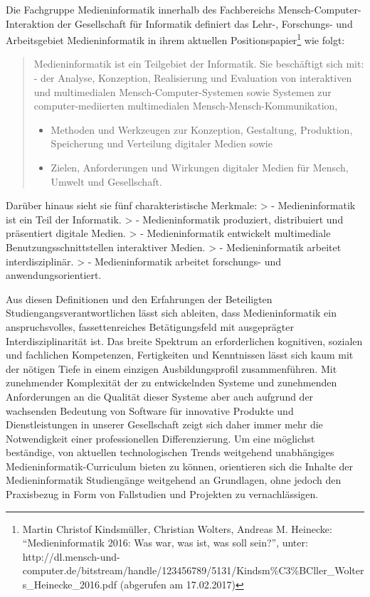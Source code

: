 Die Fachgruppe Medieninformatik innerhalb des Fachbereichs
Mensch-Computer-Interaktion der Gesellschaft für Informatik definiert
das Lehr-, Forschungs- und Arbeitsgebiet Medieninformatik in ihrem
aktuellen Positionspapier\footnote{Martin Christof Kindsmüller,
  Christian Wolters, Andreas M. Heinecke: ``Medieninformatik 2016: Was
  war, was ist, was soll sein?'', unter:
  http://dl.mensch-und-computer.de/bitstream/handle/123456789/5131/Kindsm\%C3\%BCller\_Wolters\_Heinecke\_2016.pdf
  (abgerufen am 17.02.2017)} wie folgt:

\begin{quote}
Medieninformatik ist ein Teilgebiet der Informatik. Sie beschäftigt sich
mit: - der Analyse, Konzeption, Realisierung und Evaluation von
interaktiven und multimedialen Mensch-Computer-Systemen sowie Systemen
zur computer-mediierten multimedialen Mensch-Mensch-Kommunikation,

\begin{itemize}
\tightlist
\item
  Methoden und Werkzeugen zur Konzeption, Gestaltung, Produktion,
  Speicherung und Verteilung digitaler Medien sowie
\item
  Zielen, Anforderungen und Wirkungen digitaler Medien für Mensch,
  Umwelt und Gesellschaft.
\end{itemize}
\end{quote}

Darüber hinaus sieht sie fünf charakteristische Merkmale: \textgreater{}
- Medieninformatik ist ein Teil der Informatik. \textgreater{} -
Medieninformatik produziert, distribuiert und präsentiert digitale
Medien. \textgreater{} - Medieninformatik entwickelt multimediale
Benutzungsschnittstellen interaktiver Medien. \textgreater{} -
Medieninformatik arbeitet interdisziplinär. \textgreater{} -
Medieninformatik arbeitet forschungs- und anwendungsorientiert.

Aus diesen Definitionen und den Erfahrungen der Beteiligten
Studiengangsverantwortlichen lässt sich ableiten, dass Medieninformatik
ein anspruchsvolles, fassettenreiches Betätigungsfeld mit ausgeprägter
Interdisziplinarität ist. Das breite Spektrum an erforderlichen
kognitiven, sozialen und fachlichen Kompetenzen, Fertigkeiten und
Kenntnissen lässt sich kaum mit der nötigen Tiefe in einem einzigen
Ausbildungsprofil zusammenführen. Mit zunehmender Komplexität der zu
entwickelnden Systeme und zunehmenden Anforderungen an die Qualität
dieser Systeme aber auch aufgrund der wachsenden Bedeutung von Software
für innovative Produkte und Dienstleistungen in unserer Gesellschaft
zeigt sich daher immer mehr die Notwendigkeit einer professionellen
Differenzierung. Um eine möglichst beständige, von aktuellen
technologischen Trends weitgehend unabhängiges
Medieninformatik-Curriculum bieten zu können, orientieren sich die
Inhalte der Medieninformatik Studiengänge weitgehend an Grundlagen, ohne
jedoch den Praxisbezug in Form von Fallstudien und Projekten zu
vernachlässigen.

